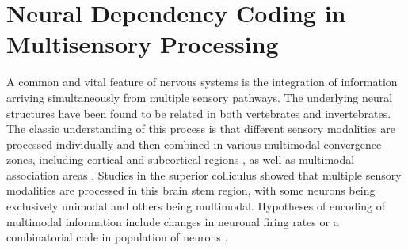 \documentclass[letterpaper]{article} %
\begin{document}
\section{Neural Dependency Coding in Multisensory Processing}
A common and vital feature of nervous systems is the integration of information arriving simultaneously from multiple sensory pathways.
The underlying neural structures have been found to be related in both vertebrates and invertebrates. The classic understanding of this process is that different sensory modalities are processed individually and then combined in various multimodal convergence zones, including cortical and subcortical regions \citep{ghazanfar2006neocortex}, as well as multimodal association areas \citep{rauschecker1995processing}. 
Studies in the superior colliculus \citep{meredith1987determinants} showed that multiple sensory modalities are processed in this brain stem region, with some neurons being exclusively unimodal and others being multimodal. Hypotheses of encoding of multimodal information include changes in neuronal firing rates \citep{pennartz2009identification} or a combinatorial code in population of neurons \citep{osborne2008neural,rohe2016distinct}.







\end{document}
